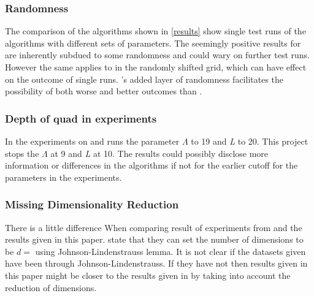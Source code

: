 \subsubsection{Randomness}
\label{disc/threats/randomness}
The comparison of the algorithms shown in \ref{results} show single test runs of the algorithms with different sets of parameters. The seemingly positive results for \qsr{} are inherently subdued to some randomness and could wary on further test runs. However the same applies to \qs{} in the randomly shifted grid, which can have effect on the outcome of single runs. \qsr{}'s added layer of randomness facilitates the possibility of both worse and better outcomes than \qs{}.

\subsubsection{Depth of quad in experiments}
In \cite{wagner17} the experiments on \qs{} and \grid{} runs the parameter $\Lambda$ to 19 and \textit{L} to 20. This project stops the $\Lambda$ at 9 and \textit{L} at 10. The results could possibly disclose more information or differences in the algorithms if not for the earlier cutoff for the parameters in the experiments.

\subsubsection{Missing Dimensionality Reduction}
There is a little difference When comparing result of experiments from \cite{wagner17} and the results given in this paper. \cite{wagner17} state that they can set the number of dimensions to be $d=$ using Johnson-Lindenstrauss lemma. It is not clear if the datasets given have been through Johnson-Lindenstrauss. If they have not then results given in this paper might be closer to the results given in \cite{wagner17} by taking into account the reduction of dimensions. 	